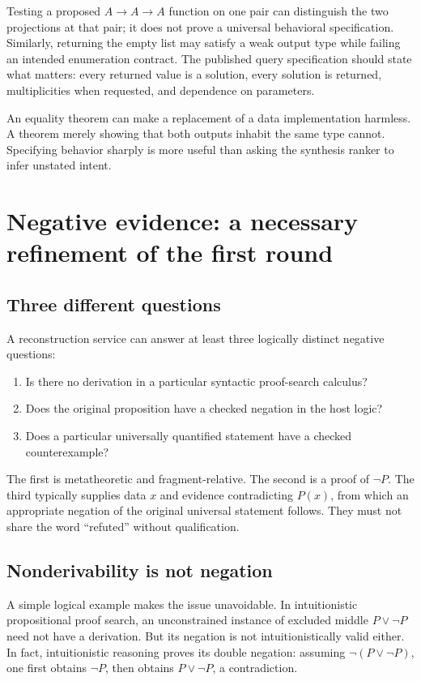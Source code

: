 \documentclass[11pt,a4paper]{article}
\theoremstyle{definition}
\begin{document}
Testing a proposed \(A\to A\to A\) function on one pair can distinguish the two projections at that pair; it does not prove a universal behavioral specification. Similarly, returning the empty list may satisfy a weak output type while failing an intended enumeration contract. The published query specification should state what matters: every returned value is a solution, every solution is returned, multiplicities when requested, and dependence on parameters.

An equality theorem can make a replacement of a data implementation harmless. A theorem merely showing that both outputs inhabit the same type cannot. Specifying behavior sharply is more useful than asking the synthesis ranker to infer unstated intent.

\section{Negative evidence: a necessary refinement of the first round}\label{sec:negative}

\subsection{Three different questions}
A reconstruction service can answer at least three logically distinct negative questions:
\begin{enumerate}
\item Is there no derivation in a particular syntactic proof-search calculus?
\item Does the original proposition have a checked negation in the host logic?
\item Does a particular universally quantified statement have a checked counterexample?
\end{enumerate}
The first is metatheoretic and fragment-relative. The second is a proof of \(\neg P\). The third typically supplies data \(x\) and evidence contradicting \(P(x)\), from which an appropriate negation of the original universal statement follows. They must not share the word ``refuted'' without qualification.

\subsection{Nonderivability is not negation}
A simple logical example makes the issue unavoidable. In intuitionistic propositional proof search, an unconstrained instance of excluded middle \(P\lor\neg P\) need not have a derivation. But its negation is not intuitionistically valid either. In fact, intuitionistic reasoning proves its double negation: assuming \(\neg(P\lor\neg P)\), one first obtains \(\neg P\), then obtains \(P\lor\neg P\), a contradiction.
\end{document}
